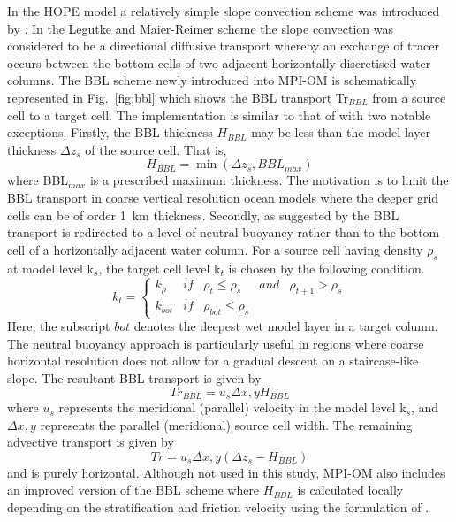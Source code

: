 In the HOPE model a relatively simple slope convection scheme
was introduced by \citet{legutke2001}.
In the Legutke and Maier-Reimer scheme the slope convection
was considered to be a directional diffusive transport whereby
an exchange of tracer occurs between the bottom cells
of two adjacent horizontally discretised water columns.
The BBL scheme newly introduced into \mbox{MPI-OM}
is schematically represented in Fig.~\ref{fig:bbl}
which shows the BBL transport Tr$_{\mathit BBL}$ from a source cell to a target cell.
The implementation is similar to that of \citet{beckmann97}
with two notable exceptions.
Firstly, the BBL thickness $H_{\mathit{BBL}}$
may be less than the model layer thickness $\Delta z_s$ of the source cell.
That is,
\begin{equation}
\label{eqn:bbl1}
H_{\mathit{BBL}} = \min \left( \Delta z_s, \mathit{BBL}_{\mathit{max}} \right)
\end{equation}
where BBL$_{\mathit{max}}$ is a prescribed maximum thickness.
The motivation is to limit the BBL transport
in coarse vertical resolution ocean models where
the deeper grid cells can be of order 1~km thickness.
Secondly, as suggested by \citet{campin99}
the BBL transport is redirected to a level of neutral buoyancy
rather than to the bottom cell of a horizontally adjacent water column.
For a source cell having density $\rho_s$ at model level k$_s$,
the target cell level k$_t$ is chosen by the following condition.
\begin{equation}
\label{eqn:bbl2}
k_t=\left\{\begin{array}{lllll}
k_{\rho} & \mathit{if} & \rho_t \le \rho_s & 
{\mathit{and}} & \rho_{t+1} > \rho_s \\
k_{\mathit{bot}} & \mathit{if} & \rho_{\mathit{bot}} \le \rho_s &&
\end{array}
\right.
\end{equation}
Here, the subscript $\mathit{bot}$ denotes the deepest wet model layer in a target column.
The neutral buoyancy approach is particularly useful in regions
where coarse horizontal resolution does not allow
for a gradual descent on a staircase-like slope.
The resultant BBL transport is given by
\begin{equation}
\label{eqn:bbl3}
Tr_{\mathit BBL} = u_s \Delta x,y H_{\mathit{BBL}}
\end{equation}
where $u_s$ represents the meridional (parallel) velocity in the model level k$_s$,
and $\Delta x,y$ represents the parallel (meridional) source cell width.
The remaining advective transport is given by
\begin{equation}
\label{eqn:bbl4}
{\mathit{Tr}} = u_s \Delta x,y (\Delta z_s - H_{\mathit{BBL}})
\end{equation}
and is purely horizontal.
Although not used in this study,
\mbox{MPI-OM} also includes
an improved version of the BBL scheme where $H_{\mathit{BBL}}$ is calculated locally
depending on the stratification and friction velocity using the formulation of \citet{killworth99}.


